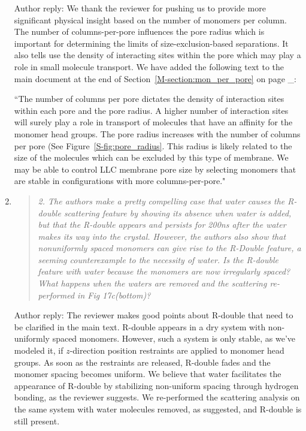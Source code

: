 \documentclass{article}
\begin{document}
\begin{enumerate}
    Author reply: We thank the reviewer for pushing us to provide more significant physical insight based
    on the number of monomers per column. The number of columns-per-pore influences the pore radius which
    is important for determining the limits of size-exclusion-based separations. It also tells use the 
    density of interacting sites within the pore which may play a role in small molecule transport. We have
    added the following text to the main document at the end of Section~\ref{M-section:mon_per_pore} on 
    page _:
    
    ``The number of columns per pore dictates the density of interaction sites within each pore and the 
    pore radius. A higher number of interaction sites will surely play a role in transport of molecules
    that have an affinity for the monomer head groups. 
    The pore radius increases with the number of columns per pore (See Figure~\ref{S-fig:pore_radius}. 
    This radius is likely related to the size of the molecules which can be excluded by this type of 
    membrane. We may be able to control LLC membrane pore size by selecting monomers that are stable
    in configurations with more columns-per-pore."
    
    \item \begin{quote}
    \textit{2. The authors make a pretty compelling case that water causes the R-double scattering feature
    by showing its absence when water is added, but that the R-double appears and persists for 200ns after
    the water makes its way into the crystal. However, the authors also show that nonuniformly spaced
    monomers can give rise to the R-Double feature, a seeming counterexample to the necessity of water.
    Is the R-double feature with water because the monomers are now irregularly spaced? What happens when
    the waters are removed and the scattering re-performed in Fig 17c(bottom)?}
    \end{quote}
    
    Author reply: The reviewer makes good points about R-double that need to be clarified in the main text.
    R-double appears in a dry system with non-uniformly spaced monomers. However, such a system is only 
    stable, as we've modeled it, if $z$-direction position restraints are applied to monomer head groups. As
    soon as the restraints are released, R-double fades and the monomer spacing becomes uniform. We believe 
    that water facilitates the appearance of R-double by stabilizing non-uniform spacing through hydrogen bonding,
    as the reviewer suggests. We re-performed the scattering analysis on the same system with water molecules
    removed, as suggested, and R-double is still present.
    

\end{enumerate}
\end{document}
